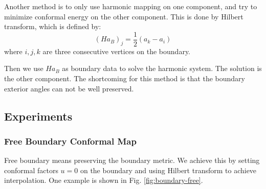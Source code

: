 Another method is to only use harmonic mapping on one component, and try to minimize conformal energy on the other component. This is done by Hilbert transform, which is defined by:
\begin{equation}
(\mathit{H}a_B)_j = \frac{1}{2}(a_k - a_i)
\end{equation}
where $i,j,k$ are three consecutive vertices on the boundary.

Then we use $\mathit{H}a_B$ as boundary data to solve the harmonic system. The solution is the other component. 
The shortcoming for this method is that the boundary exterior angles can not be well preserved.

\subsection{Experiments}
\subsubsection{Free Boundary Conformal Map}
Free boundary means preserving the boundary metric. We achieve this by setting conformal factors $u = 0$ on the boundary and using Hilbert transform to achieve interpolation. One example is shown in Fig. \ref{fig:boundary-free}.

